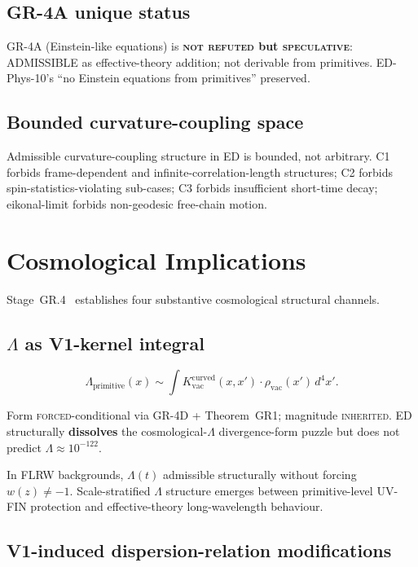 \documentclass[11pt,a4paper]{article}
\begin{document}
\subsection{GR-4A unique status}

GR-4A (Einstein-like equations) is \textbf{\textsc{not refuted} but \textsc{speculative}}: ADMISSIBLE as effective-theory addition; not derivable from primitives. ED-Phys-10's ``no Einstein equations from primitives'' preserved.

\subsection{Bounded curvature-coupling space}

Admissible curvature-coupling structure in ED is bounded, not arbitrary. C1 forbids frame-dependent and infinite-correlation-length structures; C2 forbids spin-statistics-violating sub-cases; C3 forbids insufficient short-time decay; eikonal-limit forbids non-geodesic free-chain motion.

\section{Cosmological Implications}

Stage~GR.4~\cite{gr4} establishes four substantive cosmological structural channels.

\subsection{$\Lambda$ as V1-kernel integral}

\begin{equation}
\Lambda_\mathrm{primitive}(x) \sim \int K_\mathrm{vac}^\mathrm{curved}(x, x') \cdot \rho_\mathrm{vac}(x') \, d^4 x'.
\end{equation}

Form \textsc{forced}-conditional via GR-4D + Theorem~GR1; magnitude \textsc{inherited}. ED structurally \textbf{dissolves} the cosmological-$\Lambda$ divergence-form puzzle but does not predict $\Lambda \approx 10^{-122}$.

In FLRW backgrounds, $\Lambda(t)$ admissible structurally without forcing $w(z) \neq -1$. Scale-stratified $\Lambda$ structure emerges between primitive-level UV-FIN protection and effective-theory long-wavelength behaviour.

\subsection{V1-induced dispersion-relation modifications}
\end{document}
